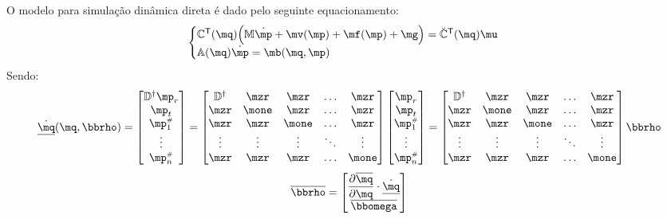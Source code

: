 \documentclass[a4paper,11pt,brazil,fleqn]{article}
\begin{document}
O modelo para simula\c{c}\~ao din\^amica direta \'e dado pelo seguinte equacionamento:
\begin{equation} \label{eq:DinamicaDireta2}
\begin{cases}
\mC^\msT(\mq) \Big( \mM \dot{\mp} + \mv(\mp) + \mf(\mp) + \mg \Big) = \breve{\mC}^\msT(\mq) \mu \\
\mA(\mq) \dot{\mp} = \mb(\mq,\mp)
\end{cases}
\end{equation}
Sendo:
\begin{equation} \label{eq:dq}
\underline{\dot{\mq}}(\mq,\mrho) = \begin{bmatrix}
\mD^\msP \mp_r \\
\mp_t \\
\mp\ssh_1 \\
\vdots \\
\mp\ssh_n \\
\end{bmatrix}
=
\begin{bmatrix}
\mD^\msP  & \mzr & \mzr & \ldots & \mzr\\
\mzr & \mone & \mzr & \ldots & \mzr\\
\mzr & \mzr & \mone & \ldots & \mzr\\
\vdots & \vdots & \vdots &  \ddots & \vdots\\
\mzr  & \mzr & \mzr &\ldots & \mone
\end{bmatrix}
\begin{bmatrix}
\mp_r \\
\mp_t \\
\mp\ssh_1 \\
\vdots \\
\mp\ssh_n \\
\end{bmatrix}
=
\begin{bmatrix}
\mD^\msP  & \mzr & \mzr & \ldots & \mzr\\
\mzr & \mone & \mzr & \ldots & \mzr\\
\mzr & \mzr & \mone & \ldots & \mzr\\
\vdots & \vdots & \vdots &  \ddots & \vdots\\
\mzr  & \mzr & \mzr &\ldots & \mone
\end{bmatrix}
\mrho
\end{equation}
\begin{equation} \label{eq:VinculosVelocidades}
\overline{\mrho} = \begin{bmatrix}
\displaystyle\frac{\partial \overline{\mq}}{\partial \mq} \cdot \underline{\dot{\mq}} \\
\overline{\momega}
\end{bmatrix}
\end{equation}
\end{document}
